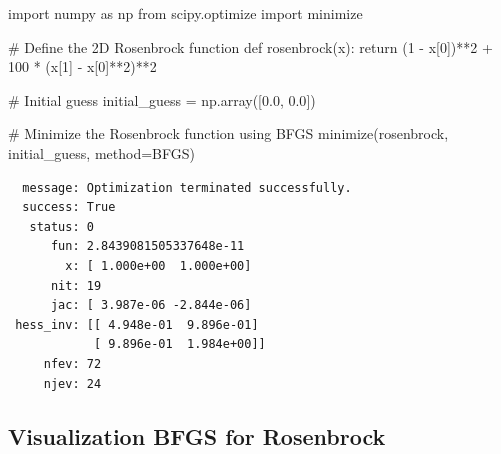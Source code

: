 \documentclass[
  letterpaper,
  DIV=11,
  numbers=noendperiod]{scrreprt}
\newenvironment{Shaded}{\begin{snugshade}}{\end{snugshade}}
\newcommand{\CommentTok}[1]{\textcolor[rgb]{0.37,0.37,0.37}{#1}}
\newcommand{\ControlFlowTok}[1]{\textcolor[rgb]{0.00,0.23,0.31}{#1}}
\newcommand{\DecValTok}[1]{\textcolor[rgb]{0.68,0.00,0.00}{#1}}
\newcommand{\FloatTok}[1]{\textcolor[rgb]{0.68,0.00,0.00}{#1}}
\newcommand{\ImportTok}[1]{\textcolor[rgb]{0.00,0.46,0.62}{#1}}
\newcommand{\KeywordTok}[1]{\textcolor[rgb]{0.00,0.23,0.31}{#1}}
\newcommand{\NormalTok}[1]{\textcolor[rgb]{0.00,0.23,0.31}{#1}}
\newcommand{\OperatorTok}[1]{\textcolor[rgb]{0.37,0.37,0.37}{#1}}
\newcommand{\StringTok}[1]{\textcolor[rgb]{0.13,0.47,0.30}{#1}}
\begin{document}
\begin{tcolorbox}[enhanced jigsaw, coltitle=black, bottomrule=.15mm, breakable, toprule=.15mm, colframe=quarto-callout-note-color-frame, title=\textcolor{quarto-callout-note-color}{\faInfo}\hspace{0.5em}{Example: BFGS for Rosenbrock}, colbacktitle=quarto-callout-note-color!10!white, opacityback=0, left=2mm, leftrule=.75mm, colback=white, rightrule=.15mm, bottomtitle=1mm, toptitle=1mm, titlerule=0mm, arc=.35mm, opacitybacktitle=0.6]

\begin{Shaded}
\begin{Highlighting}[]
\ImportTok{import}\NormalTok{ numpy }\ImportTok{as}\NormalTok{ np}
\ImportTok{from}\NormalTok{ scipy.optimize }\ImportTok{import}\NormalTok{ minimize}

\CommentTok{\# Define the 2D Rosenbrock function}
\KeywordTok{def}\NormalTok{ rosenbrock(x):}
    \ControlFlowTok{return}\NormalTok{ (}\DecValTok{1} \OperatorTok{{-}}\NormalTok{ x[}\DecValTok{0}\NormalTok{])}\OperatorTok{**}\DecValTok{2} \OperatorTok{+} \DecValTok{100} \OperatorTok{*}\NormalTok{ (x[}\DecValTok{1}\NormalTok{] }\OperatorTok{{-}}\NormalTok{ x[}\DecValTok{0}\NormalTok{]}\OperatorTok{**}\DecValTok{2}\NormalTok{)}\OperatorTok{**}\DecValTok{2}

\CommentTok{\# Initial guess}
\NormalTok{initial\_guess }\OperatorTok{=}\NormalTok{ np.array([}\FloatTok{0.0}\NormalTok{, }\FloatTok{0.0}\NormalTok{])}

\CommentTok{\# Minimize the Rosenbrock function using BFGS}
\NormalTok{minimize(rosenbrock, initial\_guess, method}\OperatorTok{=}\StringTok{\textquotesingle{}BFGS\textquotesingle{}}\NormalTok{)}
\end{Highlighting}
\end{Shaded}

\begin{verbatim}
  message: Optimization terminated successfully.
  success: True
   status: 0
      fun: 2.8439081505337648e-11
        x: [ 1.000e+00  1.000e+00]
      nit: 19
      jac: [ 3.987e-06 -2.844e-06]
 hess_inv: [[ 4.948e-01  9.896e-01]
            [ 9.896e-01  1.984e+00]]
     nfev: 72
     njev: 24
\end{verbatim}

\end{tcolorbox}

\subsection{Visualization BFGS for
Rosenbrock}\label{visualization-bfgs-for-rosenbrock}
\end{document}
